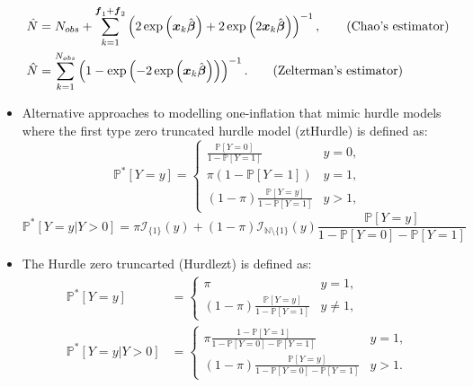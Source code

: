 \documentclass[
]{jss}
\newcommand{\1}{\mathcal{I}} \newcommand{\bx}{\boldsymbol{x}}
\begin{document}
\begin{itemize}
    \begin{align}
        \hat{N} &= N_{obs}+
        \sum_{k=1}^{\boldsymbol{f}_{1}+\boldsymbol{f}_{2}}
        \left(2\exp\left(\boldsymbol{x}_{k}\hat{\boldsymbol{\beta}}\right)+
        2\exp\left(2\boldsymbol{x}_{k}\hat{\boldsymbol{\beta}}\right)\right)^{-1},
        \tag{\text{Chao's estimator}}\\
        \hat{N}&=\sum_{k=1}^{N_{obs}}
        \left(1-\exp\left(-2\exp\left(\boldsymbol{x}_{k}\hat{\boldsymbol{\beta}}\right)\right)\right)^{-1}.
        \tag{\text{Zelterman's estimator}}
    \end{align}
    \item Alternative approaches to modelling one-inflation that mimic hurdle models where the first type zero truncated hurdle model (ztHurdle) is defined as:
    \begin{equation*}
        \mathbb{P}^{\ast}[Y=y]=\begin{cases}
        \frac{\mathbb{P}[Y=0]}{1-\mathbb{P}[Y=1]} & y=0, \\
        \pi(1-\mathbb{P}[Y=1]) & y=1, \\
        (1-\pi) \frac{\mathbb{P}[Y=y]}{1-\mathbb{P}[Y=1]} & y>1,
        \end{cases}
    \end{equation*}
    \begin{equation*}
        \mathbb{P}^{\ast}[Y=y|Y>0]=\pi\mathcal{I}_{\{1\}}(y)+
        (1-\pi)\mathcal{I}_{\mathbb{N}\setminus\{1\}}(y)\frac{\mathbb{P}[Y=y]}{1-\mathbb{P}[Y=0]-\mathbb{P}[Y=1]}
    \end{equation*}
    \item The Hurdle zero truncarted (Hurdlezt) is defined as:
    \begin{align*}
        \mathbb{P}^{\ast}[Y=y]&=\begin{cases}
        \pi & y=1, \\
        (1-\pi) \frac{\mathbb{P}[Y=y]}{1-\mathbb{P}[Y=1]} & y\neq1,
        \end{cases}\\
        \mathbb{P}^{\ast}[Y=y|Y>0]&=\begin{cases}
            \pi\frac{1-\mathbb{P}[Y=1]}{1-\mathbb{P}[Y=0]-\mathbb{P}[Y=1]} & y=1,\\
            (1-\pi)\frac{\mathbb{P}[Y=y]}{1-\mathbb{P}[Y=0]-\mathbb{P}[Y=1]} & y>1.
        \end{cases}
    \end{align*}
\end{itemize}
\end{document}
